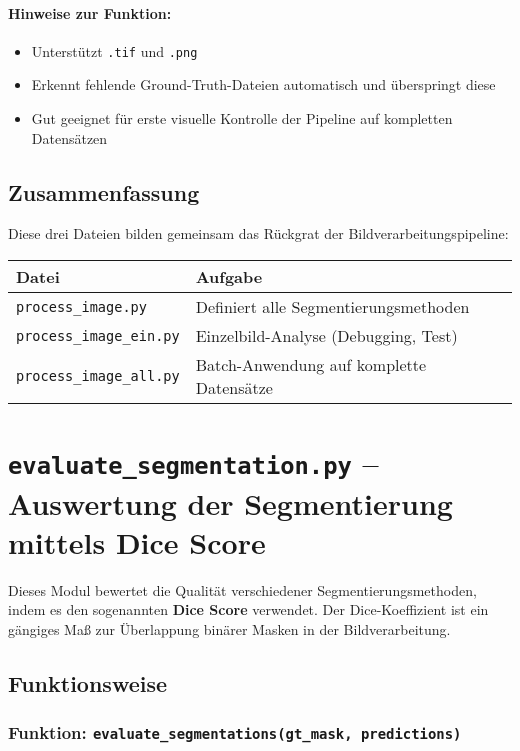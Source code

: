 \documentclass[a4paper,12pt]{article}
\begin{document}
\paragraph{Hinweise zur Funktion:}
\begin{itemize}
  \item Unterstützt \texttt{.tif} und \texttt{.png}
  \item Erkennt fehlende Ground-Truth-Dateien automatisch und überspringt diese
  \item Gut geeignet für erste visuelle Kontrolle der Pipeline auf kompletten Datensätzen
\end{itemize}

\subsection*{ Zusammenfassung}

Diese drei Dateien bilden gemeinsam das Rückgrat der Bildverarbeitungspipeline:

\begin{center}
\begin{tabular}{|l|l|}
\hline
\textbf{Datei} & \textbf{Aufgabe} \\
\hline
\texttt{process\_image.py} & Definiert alle Segmentierungsmethoden \\
\texttt{process\_image\_ein.py} & Einzelbild-Analyse (Debugging, Test) \\
\texttt{process\_image\_all.py} & Batch-Anwendung auf komplette Datensätze \\
\hline
\end{tabular}
\end{center}


\section*{ \texttt{evaluate\_segmentation.py} – Auswertung der Segmentierung mittels Dice Score}

Dieses Modul bewertet die Qualität verschiedener Segmentierungsmethoden, indem es den sogenannten \textbf{Dice Score} verwendet. Der Dice-Koeffizient ist ein gängiges Maß zur Überlappung binärer Masken in der Bildverarbeitung.

\subsection*{ Funktionsweise}

\subsubsection*{Funktion: \texttt{evaluate\_segmentations(gt\_mask, predictions)}}
\end{document}
